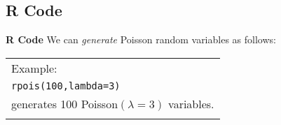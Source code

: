 \documentclass[compress]{beamer}        %
\makeatletter
\newcommand{\tcb}{\textcolor{beamer@blendedblue}}
\makeatother
\begin{document}
\subsection{R Code}
\begin{frame}{\bf \tcb{R Code}}
We can \emph{generate} Poisson random variables as follows:\\[0.5cm]

\begin{tabular}{|l|}
\hline
Example: \\[0.2cm]
\texttt{rpois(100,lambda=3)} \\
generates 100 Poisson$(\lambda=3)$ variables.\\
\hline
\multicolumn{1}{c}{}\\[0.2cm]
\end{tabular}


\end{frame}
\end{document}
